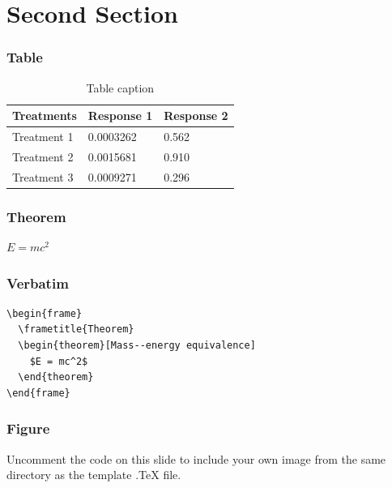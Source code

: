 \documentclass{beamer}
\begin{document}
\section{Second Section}

\begin{frame}
  \frametitle{Table}
  \begin{table}
    \begin{tabular}{l l l}
      \toprule
      \textbf{Treatments} & \textbf{Response 1} & \textbf{Response 2}\\
      \midrule
      Treatment 1 & 0.0003262 & 0.562 \\
      Treatment 2 & 0.0015681 & 0.910 \\
      Treatment 3 & 0.0009271 & 0.296 \\
      \bottomrule
    \end{tabular}
    \caption{Table caption}
  \end{table}
\end{frame}


\begin{frame}
  \frametitle{Theorem}
  \begin{theorem}
    $E = mc^2$
  \end{theorem}
\end{frame}


\begin{frame}[fragile] %
  \frametitle{Verbatim}
  \begin{example}
\begin{verbatim}
\begin{frame}
  \frametitle{Theorem}
  \begin{theorem}[Mass--energy equivalence]
    $E = mc^2$
  \end{theorem}
\end{frame}\end{verbatim}
\end{example}
\end{frame}


\begin{frame}
  \frametitle{Figure}
  Uncomment the code on this slide to include your own image from the same directory as the template .TeX file.
\end{frame}
\end{document}

